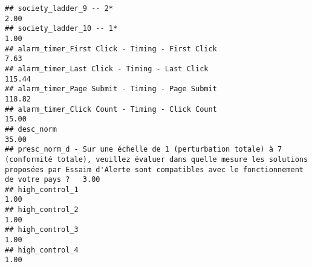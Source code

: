 \documentclass[
]{article}
\begin{document}
\begin{verbatim}
## society_ladder_9 -- 2*                                                                                                                                                                                                       2.00
## society_ladder_10 -- 1*                                                                                                                                                                                                      1.00
## alarm_timer_First Click - Timing - First Click                                                                                                                                                                               7.63
## alarm_timer_Last Click - Timing - Last Click                                                                                                                                                                               115.44
## alarm_timer_Page Submit - Timing - Page Submit                                                                                                                                                                             118.82
## alarm_timer_Click Count - Timing - Click Count                                                                                                                                                                              15.00
## desc_norm                                                                                                                                                                                                                   35.00
## presc_norm_d - Sur une échelle de 1 (perturbation totale) à 7 (conformité totale), veuillez évaluer dans quelle mesure les solutions proposées par Essaim d'Alerte sont compatibles avec le fonctionnement de votre pays ?   3.00
## high_control_1                                                                                                                                                                                                               1.00
## high_control_2                                                                                                                                                                                                               1.00
## high_control_3                                                                                                                                                                                                               1.00
## high_control_4                                                                                                                                                                                                               1.00

\end{verbatim}
\end{document}
